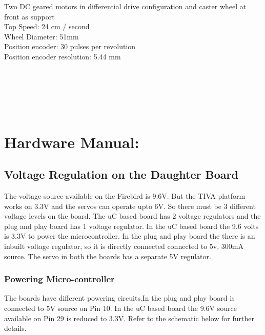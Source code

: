 \documentclass[a4paper,10pt,oneside]{article}
\begin{document}
{			{Two DC geared motors in differential drive configuration and caster wheel at front as support\\
			Top Speed: 24 cm / second\\
			Wheel Diameter: 51mm\\
			Position encoder: 30 pulses per revolution\\
			Position encoder resolution: 5.44 mm\\
			\\
			\\
			\\
			\\
			\\}
		
		
		
	\section{\Huge\textbf{Hardware Manual:}}
	\subsection{\huge \textbf{Voltage Regulation on the Daughter Board}}
	{The voltage source available on the Firebird is 9.6V. But the TIVA platform works on 3.3V and the servos can operate upto 6V. So there must be 3 different voltage levels on the board. The uC based board has 2 voltage regulators and the plug and play board has 1 voltage regulator. In the uC based board the 9.6 volts is 3.3V to power the microcontroller. In the plug and play board the there is an inbuilt voltage regulator, so it is directly connected connected to 5v, 300mA source. The servo in both the boards has a separate 5V regulator.}
	
	\subsubsection{\Large \textbf{Powering Micro-controller}}
	{The boards have different powering circuits.In the plug and play board is connected to 5V source on Pin 10. In the uC based board the 9.6V source available on Pin 29 is reduced to 3.3V. Refer to the schematic below for further details.\\} 
				
}
\end{document}
